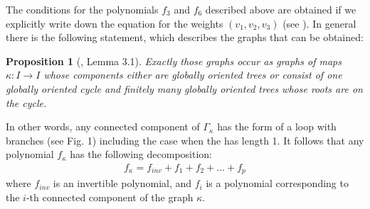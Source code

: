 \documentclass[reqno,12pt]{amsart}
\numberwithin{equation}{section}
\theoremstyle{plain}
\newtheorem{proposition}[theorem]{Proposition}
\theoremstyle{definition}
\begin{document}
The conditions for the polynomials $f_3$ and $f_6$ described above are obtained if we explicitly write down the equation for the weights $(v_1,v_2,v_3)$ (see \cite{AGV}). In general there is the following statement, which describes the graphs that can be obtained:

\begin{proposition}[\cite{HK}, Lemma 3.1]{\label{arb}}
Exactly those graphs occur as graphs of maps $\kappa:I \to I$ whose components either are globally oriented trees or consist of one globally oriented cycle and finitely many globally oriented trees whose roots are on the cycle.
\end{proposition}

In other words, any connected component of $\Gamma_\kappa$ has the form of a loop with branches (see Fig. 1) including the case when the  has length 1. It follows that any polynomial $f_\kappa$ has the following decomposition:
\begin{align*}
    f_\kappa = f_{inv} + f_1 + f_2 + \dots + f_p
\end{align*}
where $f_{inv}$ is an invertible polynomial, and $f_i$ is a polynomial corresponding to the $i$-th connected component of the graph $\kappa$.
\end{document}
